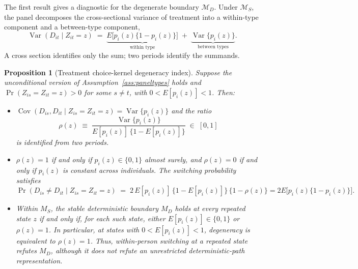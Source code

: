 \documentclass[11pt]{article}
\newtheorem{proposition}{Proposition}
\newcommand{\1}{\mathbf{1}}
\begin{document}
The first result gives a diagnostic for the degenerate boundary $\mathcal M_D$. Under $\mathcal M_S$, the panel decomposes the cross-sectional variance of treatment into a within-type component and a between-type component,
\begin{equation}
\operatorname{Var}(D_{it} \mid Z_{it} = z)
\;=\;
\underbrace{E\big[p_i(z)\{1 - p_i(z)\}\big]}_{\text{within type}}
\;+\;
\underbrace{\operatorname{Var}\{p_i(z)\}}_{\text{between types}}.
\label{eq:vardecomp}
\end{equation}
A cross section identifies only the sum; two periods identify the summands.

\begin{proposition}[Treatment choice-kernel degeneracy index]
\label{prop:determinacy}Suppose the unconditional version of Assumption~\ref{ass:paneltypes} holds
and $\Pr(Z_{is}=Z_{it}=z)>0$ for some $s\neq t$, with
$0<E[p_i(z)]<1$. Then:
\begin{itemize}
\item[(a)] $\operatorname{Cov}(D_{is}, D_{it} \mid Z_{is} = Z_{it} = z) = \operatorname{Var}\{p_i(z)\}$ and the ratio
\[
\rho(z) \;\equiv\; \frac{\operatorname{Var}\{p_i(z)\}}{E[p_i(z)]\,\{1 - E[p_i(z)]\}} \;\in\; [0,1]
\]
is identified from two periods.
\item[(b)] $\rho(z) = 1$ if and only if $p_i(z) \in \{0,1\}$ almost surely, and $\rho(z) = 0$ if and only if $p_i(z)$ is constant across individuals. The switching probability satisfies
\[
\Pr(D_{is} \neq D_{it} \mid Z_{is} = Z_{it} = z)
\;=\;
2\, E[p_i(z)]\,\{1 - E[p_i(z)]\}\,\{1 - \rho(z)\}=2E\big[p_i(z)\{1 - p_i(z)\}\big].
\]
\item[(c)] Within $M_S$, the stable deterministic boundary $M_D$ holds
at every repeated state $z$ if and only if, for each such state, either
$E[p_i(z)]\in\{0,1\}$ or $\rho(z)=1$. In particular, at states with
$0<E[p_i(z)]<1$, degeneracy is equivalent to $\rho(z)=1$.
Thus, within-person switching at a repeated state refutes $M_D$, although
it does not refute an unrestricted deterministic-path representation.
\end{itemize}
\end{proposition}
\end{document}
